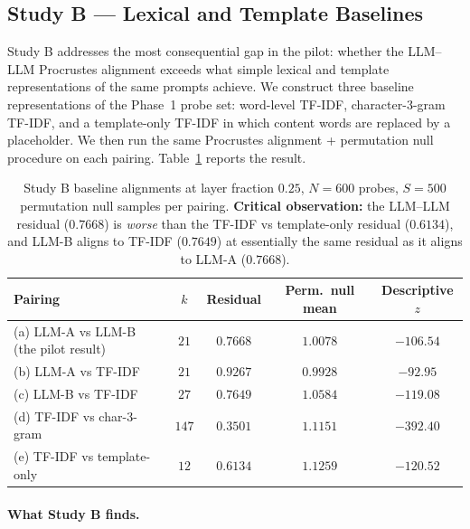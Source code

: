 \subsection{Study B — Lexical and Template Baselines}
\label{sec:results-study-b}

Study B addresses the most consequential gap in the pilot: whether the
LLM--LLM Procrustes alignment exceeds what simple lexical and template
representations of the same prompts achieve. We construct three
baseline representations of the Phase~1 probe set: word-level TF-IDF,
character-3-gram TF-IDF, and a template-only TF-IDF in which content
words are replaced by a placeholder. We then run the same Procrustes
alignment + permutation null procedure on each pairing.
Table~\ref{tab:study-b} reports the result.

\begin{table}[h]
\centering
\caption{Study B baseline alignments at layer fraction $0.25$,
$N = 600$ probes, $S = 500$ permutation null samples per pairing.
\textbf{Critical observation:} the LLM--LLM residual ($0.7668$) is
\emph{worse} than the TF-IDF vs template-only residual ($0.6134$),
and LLM-B aligns to TF-IDF ($0.7649$) at essentially the same residual
as it aligns to LLM-A ($0.7668$).}
\label{tab:study-b}
\begin{tabular}{l c c c c}
\toprule
Pairing & $k$ & Residual & Perm.\ null mean & Descriptive $z$ \\
\midrule
(a) LLM-A vs LLM-B (the pilot result)              & $21$ & $0.7668$ & $1.0078$ & $-106.54$ \\
(b) LLM-A vs TF-IDF                                & $21$ & $0.9267$ & $0.9928$ & $-92.95$  \\
(c) LLM-B vs TF-IDF                                & $27$ & $0.7649$ & $1.0584$ & $-119.08$ \\
(d) TF-IDF vs char-3-gram                          & $147$ & $0.3501$ & $1.1151$ & $-392.40$ \\
(e) TF-IDF vs template-only                        & $12$ & $0.6134$ & $1.1259$ & $-120.52$ \\
\bottomrule
\end{tabular}
\end{table}

\paragraph{What Study B finds.}

